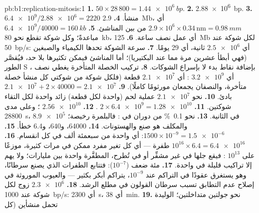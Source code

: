 \begin{solution}{pb:b1:replication-mitosis:1}
\textbf{1.} $50\times 28\,800 = \qty{1.44e6}{bp}$.
\textbf{2.} \qty{2.88e6}{bp}.
\textbf{3.} $\num{6.4e9}/\num{2.88e6} = 2220$ منشأ.
\textbf{4.} \qty{2.9}{Mb}، أي $2.9\times 10^6\times 0.34\,\mathrm{nm} =
\qty{0.98}{mm}$ من  بين المناشئ.
\textbf{5.} $\num{6.4e9}/\num{40000} = \qty{160}{kb}$ مباعدةً؛ وكل
شوكة تقطع نحو \qty{80}{kb}، أي عمل نصف ساعة.
\textbf{6.} \qty{125}{Mb} لكل شوكة عند \qty{50}{bp/s}: أي
$\num{2.5e6}$ ثانية، أي 29 يومًا.
\textbf{7.} سرعة الشوكة تحدها الكيمياء والصبغين (فهي أبطأ عشرين مرة
مما عند البكتيريا)؛ أما المناشئ فيمكن تكثيرها بلا حد، فيُقصَّر الطور
S بإضافة نقاط بدء لا بإسراع الشوكات.
\textbf{8.} تركيب الخصلة المتأخرة يغطي نصف ، أي
$\num{3.2e9}$ : أي $\num{2.1e7}$ قطعة (فلكل شوكة من شوكتي كل
منشأ خصلة متأخرة، والنصفان يجمعان مورثومًا كاملًا).
\textbf{9.} $\num{2.1e7} + 2\times\num{40000} = \num{2.1e7}$ بادئ.
\textbf{10.} نحو $\num{2.1e7}$ عملية لحم (واحدة لكل قطعة) زائد واحدة
لكل التقاء شوكتين.
\textbf{11.} $2\times\num{6.4e9} = \num{1.28e10}$ .
\textbf{12.} $\num{2.56e10}$ ؛ وعلى مدى \qty{28800}{s}،
$\num{8.9e5}$ في الثانية.
\textbf{13.} نحو \qty{0.1}{\%} من دوران  في : فالبلمرة
رخيصة؛ والمكلف هو صنع  والهستونات.
\textbf{14.} \num{64000}، و640، و6.4 خطأ.
\textbf{15.} $1500\times 10^{-9} = \num{1.5e-6}$: أي  واحدة من
سبعمئة ألف في كل انقسام.
\textbf{16.} $10^{16}\times 6.4 = \num{6.4e16}$ طفرة --- أي كل تغير
مفرد ممكن في  مرات كثيرة، موزعًا على $10^{13}$ : فيقع
جلها في  غير مشفِّر أو في  تُطرح،  المطفَّرة واحدة بين
مليارات؛ ولا يهم إلا تراكيب قليلة في  واحدة.
\textbf{17.} مئة ضعف ($10^{-7}$): فتتابع الطفرات الذي يصنع سرطانًا،
وهو يستغرق عقودًا في التراكم عند $10^{-9}$، يتراكم أبكر بكثير ---
والعيوب الموروثة في إصلاح عدم التطابق تسبب سرطان القولون في مطلع
الرشد.
\textbf{18.} $\num{2.3e6}$ زوج لكل شوكة عند \qty{1000}{bp/s}: أي
\qty{2300}{s}، أي \qty{38}{min}.
\textbf{19.} نحو جولتين متداخلتين؛  الوليدة تحمل منشأين (كل

\end{solution}
